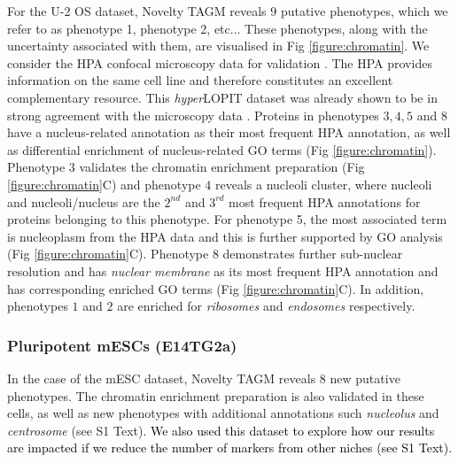 \documentclass[12pt,english]{article}
\begin{document}
For the U-2 OS dataset, Novelty TAGM reveals $9$ putative phenotypes, which we refer to as phenotype 1, phenotype 2, etc... These phenotypes, along with the uncertainty associated with them, are visualised in Fig \ref{figure:chromatin}. We consider the HPA confocal microscopy data for validation \citep{Thul:2017, Sullivan:2018}. The HPA provides information on the same cell line and therefore constitutes an excellent complementary resource. This \textit{hyper}LOPIT dataset was already shown to be in strong agreement with the microscopy data \citep{Thul:2017, DC:2018}. Proteins in phenotypes $3,4,5$ and $8$ have a nucleus-related annotation as their most frequent HPA annotation, as well as differential enrichment of nucleus-related GO terms (Fig \ref{figure:chromatin}). Phenotype $3$ validates the chromatin enrichment preparation (Fig \ref{figure:chromatin}C) and phenotype $4$ reveals a nucleoli cluster, where nucleoli and nucleoli/nucleus are the $2^{nd}$ and $3^{rd}$ most frequent HPA annotations for proteins belonging to this phenotype. For phenotype 5, the most associated term is nucleoplasm from the HPA data and this is further supported by GO analysis (Fig \ref{figure:chromatin}C). Phenotype $8$ demonstrates further sub-nuclear resolution and has \textit{nuclear membrane} as its most frequent HPA annotation and has corresponding enriched GO terms (Fig \ref{figure:chromatin}C). In addition, phenotypes $1$ and $2$ are enriched for \textit{ribosomes} and \textit{endosomes} respectively.
\subsubsection*{Pluripotent mESCs (E14TG2a)}
In the case of the mESC dataset, Novelty TAGM reveals $8$ new putative phenotypes. The chromatin enrichment preparation is also validated in these cells, as well as new phenotypes with additional annotations such \textit{nucleolus} and \textit{centrosome} (see S1 Text). \textcolor{black}{We also used this dataset to explore how our results are impacted if we reduce the number of markers from other niches (see S1 Text).}
\end{document}
